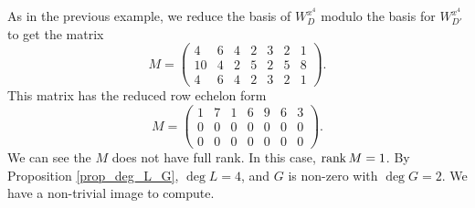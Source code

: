 As in the previous example, we reduce the basis of $W_{D}^{x^4}$ modulo the basis for $W_{D'}^{x^4}$ to get the matrix
\[ M = \begin{pmatrix}
   4 & 6 & 4 & 2 & 3 & 2 & 1 \\
  10 & 4 & 2 & 5 & 2 & 5 & 8 \\
   4 & 6 & 4 & 2 & 3 & 2 & 1
\end{pmatrix}. \]
This matrix has the reduced row echelon form
\[ M = \begin{pmatrix}
  1 & 7 & 1 & 6 & 9 & 6 & 3 \\
  0 & 0 & 0 & 0 & 0 & 0 & 0 \\
  0 & 0 & 0 & 0 & 0 & 0 & 0
\end{pmatrix}. \]
We can see the $M$ does not have full rank.
In this case, $\operatorname{rank} M = 1$.
By Proposition \ref{prop_deg_L_G},
$\deg L = 4$, and $G$ is non-zero with $\deg G = 2$.
We have a non-trivial image to compute.
\begin{comment}
\begin{align*}
  \ker M
    &= \Span \left\{ \begin{array}{l}
      g - 7f, \\
      h -  f, \\
      xf - 6f, \\
      xg - 9f, \\
      xh - 6f, \\
      x^2f - 3f \end{array} \right\} 
    = \Span \left\{ \begin{array}{l}
      xy + 4x^2 - 5y - 5x - 5, \\
      y^2 - x^2 + 2y - 2x + 1, \\
      x^3 + xy - x^2 + 5y + 4x + 5, \\
      x^2y + 2xy - x^2 + 2y + x + 2, \\
      xy^2 + 3xy - 3x^2 + 5y + 5x + 5, \\
      x^4 + x^2y + 5x^3 - 2x^2 - 3y - 4x - 3
    \end{array} \right\}.
\end{align*}
Comparing the result to Table \ref{tab_divisor_types},
$L$ is degree 4 and $I_L$ has polynomials with leading monomials $xy$, $y^2$, and $x^3$,
so $L$ must be type 41 and $I_L$ is generated by the first three polynomials.
After reducing the third polynomial modulo the first to eliminate the $xy$ term,
we have a reduced Gr\"obner basis for $I_L$,
\[ I_L = \left\langle\begin{array}{l}
      xy  + 4x^2 - 5y - 5x - 5, \\
      y^2 -  x^2 + 2y - 2x + 1, \\
      x^3 - 5x^2 -  y - 2x - 1
  \end{array}\right\rangle. \]
\end{comment}
